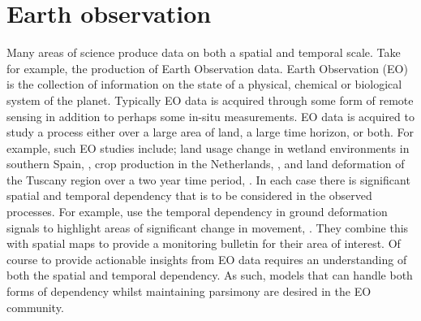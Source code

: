 \section{Earth observation\label{sec:eo}}
Many areas of science produce data on both a spatial and temporal scale.
Take for example, the production of Earth Observation data. Earth Observation (EO) is the collection of information on the state of a physical, chemical or biological system of the planet.
Typically EO data is acquired through some form of remote sensing in addition to perhaps some in-situ measurements.
EO data is acquired to study a process either over a large area of land, a large time horizon, or both.
For example, such EO studies include; land usage change in wetland environments in southern Spain, \citep{muro_short-term_2016}, crop production in the Netherlands, \citep{khabbazan_crop_2019}, and land deformation of the Tuscany region over a two year time period, \citep{raspini_continuous_2018}.
In each case there is significant spatial and temporal dependency that is to be considered in the observed processes.
For example, \citeauthor{raspini_continuous_2018} use the temporal dependency in ground deformation signals to highlight areas of significant change in movement, \citep{raspini_continuous_2018}.
They combine this with spatial maps to provide a monitoring bulletin for their area of interest.
Of course to provide actionable insights from EO data requires an understanding of both the spatial and temporal dependency.
As such, models that can handle both forms of dependency whilst maintaining parsimony are desired in the EO community. 

